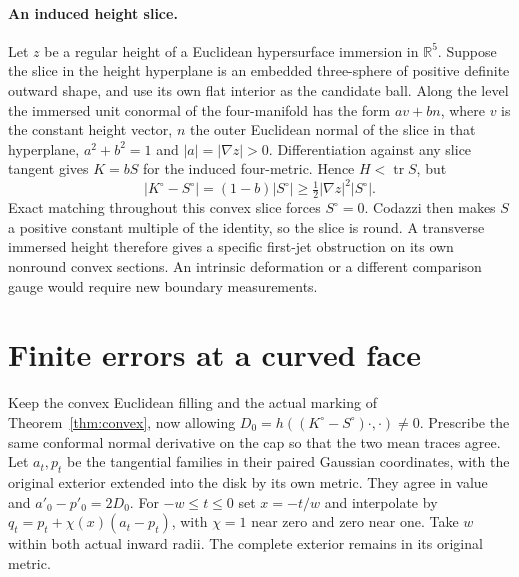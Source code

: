 \documentclass[11pt,letterpaper]{article}
\numberwithin{equation}{section}
\DeclareMathOperator{\tr}{tr}
\begin{document}
\paragraph{An induced height slice.}
Let \(z\) be a regular height of a Euclidean hypersurface immersion
in \(\mathbb R^5\). Suppose the slice in the height hyperplane
is an embedded three-sphere of positive definite outward shape, and use its own flat
interior as the candidate ball. Along the level the immersed unit
conormal of the four-manifold has the form \(a v+b n\), where
\(v\) is the constant height vector, \(n\) the outer Euclidean
normal of the slice in that hyperplane, \(a^2+b^2=1\) and
\(|a|=|\nabla z|>0\). Differentiation against any slice tangent
gives \(K=bS\) for the induced four-metric. Hence \(H<\tr S\), but
\[
 |K^\circ-S^\circ|=(1-b)|S^\circ|
 \ge \tfrac12 |\nabla z|^2 |S^\circ|.
\]
Exact matching throughout this convex slice forces \(S^\circ=0\).
Codazzi then makes \(S\) a positive constant multiple of the identity,
so the slice is round. A transverse immersed height therefore gives a
specific first-jet obstruction on its own nonround convex sections.
An intrinsic deformation or a different comparison gauge would
require new boundary measurements.

\section{Finite errors at a curved face}\label{sec:finite-face}

Keep the convex Euclidean filling and the actual marking of
Theorem~\ref{thm:convex}, now allowing
\(D_0=h((K^\circ-S^\circ)\cdot,\cdot)\ne0\).
Prescribe the same conformal normal derivative on the cap so that
the two mean traces agree. Let \(a_t,p_t\) be the tangential
families in their paired Gaussian coordinates, with the original
exterior extended into the disk by its own metric. They agree in
value and \(a'_0-p'_0=2D_0\). For \(-w\le t\le0\) set \(x=-t/w\)
and interpolate by \(q_t=p_t+\chi(x)(a_t-p_t)\), with \(\chi=1\)
near zero and zero near one. Take \(w\) within both actual inward
radii. The complete exterior remains in its original metric.
\end{document}
